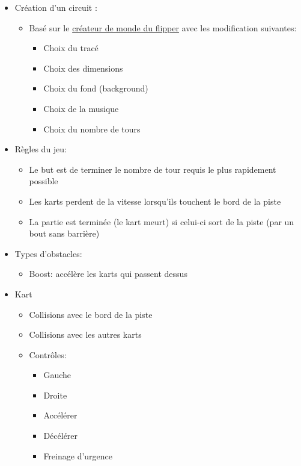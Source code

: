 \documentclass{article}
\begin{document}
\begin{itemize}
    \item Création d'un circuit :
          \begin{itemize}
              \item Basé sur le \href{https://lj44.ch/creator/flipper}{créateur de monde du flipper} avec les modification suivantes: \begin{itemize}
                        \item Choix du tracé
                        \item Choix des dimensions
                        \item Choix du fond (background)
                        \item Choix de la musique
                        \item Choix du nombre de tours
                    \end{itemize}
          \end{itemize}
    \item Règles du jeu: \begin{itemize}
        \item Le but est de terminer le nombre de tour requis le plus rapidement possible
        \item Les karts perdent de la vitesse lorsqu'ils touchent le bord de la piste
        \item La partie est terminée (le kart meurt) si celui-ci sort de la piste (par un bout sans barrière)
    \end{itemize}
    \item Types d'obstacles:\begin{itemize}
        \item Boost: accélère les karts qui passent dessus
    \end{itemize}
    \item Kart \begin{itemize}
        \item Collisions avec le bord de la piste
        \item Collisions avec les autres karts
        \item Contrôles: \begin{itemize}
            \item Gauche
            \item Droite
            \item Accélérer
            \item Décélérer
            \item Freinage d'urgence
        \end{itemize}
    \end{itemize}
\end{itemize}
\end{document}
